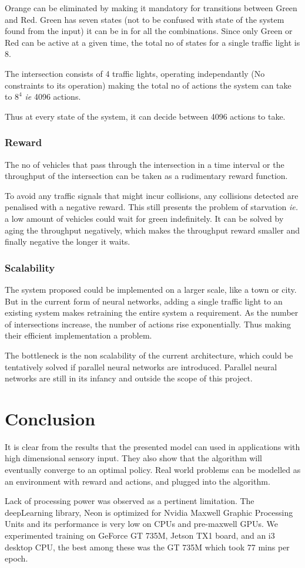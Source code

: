 \documentclass[a4paper,11pt]{report}
\begin{document}
				Orange can be eliminated by making it mandatory for transitions between Green and Red. Green has seven states (not to be confused with state of the system found from the input) it can be in for all the combinations. Since only Green or Red can be active at a given time, the total no of states for a single traffic light is 8.

				The intersection consists of 4 traffic lights, operating independantly (No constraints to its operation) making the total no of actions the system can take to $8^4$ \emph{ie} 4096 actions.

				Thus at every state of the system, it can decide between 4096 actions to take.
			\subsection{Reward}
				The no of vehicles that pass through the intersection in a time interval or the throughput of the intersection can be taken as a rudimentary reward function.

				To avoid any traffic signals that might incur collisions, any collisions detected are penalised with a negative reward. This still presents the problem of starvation \emph{ie.} a low amount of vehicles could wait for green indefinitely. It can be solved by aging the throughput negatively, which makes the throughput reward smaller and finally negative the longer it waits.
			\subsection{Scalability}
				The system proposed could be implemented on a larger scale, like a town or city. But in the current form of neural networks, adding a single traffic light to an existing system makes retraining the entire system a requirement. As the number of intersections increase, the number of actions rise exponentially. Thus making their efficient implementation a problem.

				The bottleneck is the non scalability of the current architecture, which could be tentatively solved if parallel neural networks are introduced. Parallel neural networks are still in its infancy and outside the scope of this project.
	\chapter{Conclusion}
		It is clear from the results that the presented model can used in applications with high dimensional sensory input. They also show that the algorithm will eventually converge to an optimal policy. Real world problems can be modelled as an environment with reward and actions, and plugged into the algorithm.

		Lack of processing power was observed as a pertinent limitation. The deepLearning library, Neon is optimized for Nvidia Maxwell Graphic Processing Units and its performance is very low on CPUs and pre-maxwell GPUs. We experimented training on GeForce GT 735M, Jetson TX1 board, and an i3 desktop CPU, the best among these was the GT 735M which took 77 mins per epoch.


	\newpage
	\nocite{*}
	
	
\end{document}
